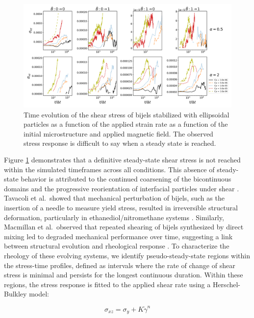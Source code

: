 \begin{figure} 
    \centering 
    \includegraphics[scale=0.3]{../figures/results/paper3/stress-time_compare.png} 
    \caption{Time evolution of the shear stress of bijels stabilized with ellipsoidal particles as a function of the applied strain rate as
             a function of the initial microstructure and applied magnetic field. The observed stress response is difficult to say when a steady
             state is reached.} 
    \label{fig:stress_time} 
\end{figure}

Figure \ref{fig:stress_time} demonstrates that a definitive steady-state shear stress is not reached within the simulated timeframes across all conditions. 
This absence of steady-state behavior is attributed to the continued coarsening of the bicontinuous domains and the progressive reorientation of interfacial 
particles under shear \cite{tavacoli_novel_2011, macmillan_rheological_2019}. Tavacoli et al.\ showed that mechanical perturbation of bijels, such as the 
insertion of a needle to measure yield stress, resulted in irreversible structural deformation, particularly in ethanediol/nitromethane systems 
\cite{tavacoli_novel_2011}. Similarly, Macmillan et al.\ observed that repeated shearing of bijels synthesized by direct mixing led to degraded mechanical 
performance over time, suggesting a link between structural evolution and rheological response \cite{macmillan_rheological_2019}. To characterize the rheology 
of these evolving systems, we identify pseudo-steady-state regions within the stress-time profiles, defined as intervals where the rate of change of shear 
stress is minimal and persists for the longest continuous duration. Within these regions, the stress response is fitted to the applied shear rate using a 
Herschel-Bulkley model:  

\begin{equation}
    \sigma_{xz} = \sigma_{y} + K\dot{\gamma}^{n}    
\end{equation}

